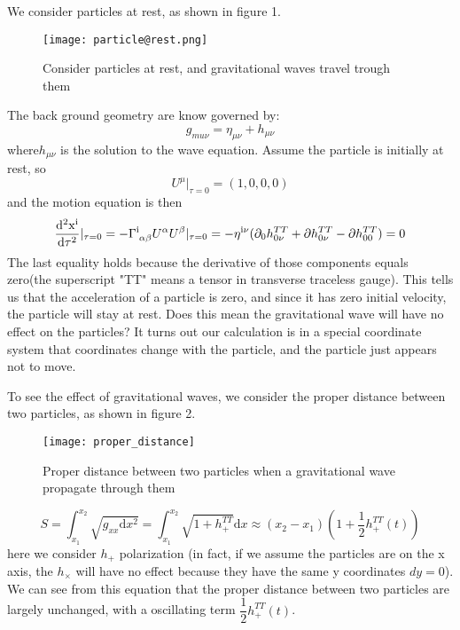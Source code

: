 \documentclass[10pt]{article}
\begin{document}
We consider particles at rest, as shown in figure 1. 
\begin{figure}
	\centering
	\texttt{[image: particle@rest.png]}
	\caption{Consider particles at rest, and gravitational waves travel trough them}
	\label{fig: particle at rest}
\end{figure}
The back ground geometry are know governed by:
\begin{equation}\label{eq: background metric}
g_{mu\nu}=\eta_{\mu\nu}+h_{\mu\nu}
\end{equation}
where$ h_{\mu\nu} $ is the solution to the wave equation. Assume the particle is initially at rest, so
\begin{equation}\label{eq: initial_velocity}
U^\mu |_{\tau=0}=(1,0,0,0)
\end{equation}
and the motion equation is then
\begin{equation}\label{eq: motion equation}
\dfrac{\mathrm{d^2 x^{\mathrm{i}}}}{\mathrm{d} \tau^2}|_{\tau=0}=-\Gamma^{\rm i}_{\hphantom{\rm i}\alpha\beta}  U^\alpha U^\beta |_{\tau=0}=-\eta^{\rm i \nu} (\partial_0 h^{TT}_{0 \nu}+\partial h^{TT}_{0 \nu}- \partial h^{TT}_{00})=0
\end{equation}
The last equality holds because the derivative of those components equals zero(the superscript "TT" means a tensor in transverse traceless gauge). This tells us that the acceleration of a particle is zero, and since it has zero initial velocity, the particle will stay at rest. Does this mean the gravitational wave will have no effect on the particles? It turns out our calculation is in a special coordinate system that coordinates change with the particle, and the particle just appears not to move.

To see the effect of gravitational waves, we consider the proper distance between two particles, as shown in figure 2.
\begin{figure}
	\centering
	\texttt{[image: proper\_distance]}
	\caption{Proper distance between two particles when a gravitational wave propagate through them}
	\label{fig:properdistance}
\end{figure}
\begin{equation}\label{eq: proper_distance}
S=\int_{x_1}^{x_2} \sqrt{g_{xx} \mathrm{d} x^2}=\int_{x_1}^{x_2}\sqrt{1+h^{TT}_{+}} \mathrm{d} x \approx (x_2-x_1)(1+\dfrac{1}{2} h^{TT}_+(t))
\end{equation}
here we consider $ h_+ $ polarization (in fact, if we assume the particles are on the x axis, the $ h_\times $ will have no effect because they have the same y coordinates $ d y=0 $). We can see from this equation that the proper distance between two particles are largely unchanged, with a oscillating term $ \dfrac{1}{2} h^{TT}_+(t) $.
\end{document}
